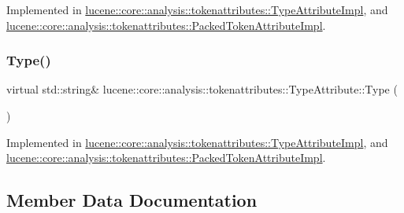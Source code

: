 Implemented in \mbox{\hyperlink{classlucene_1_1core_1_1analysis_1_1tokenattributes_1_1TypeAttributeImpl_a237875b669558ea7d58b6fa0b46a16a1}{lucene\+::core\+::analysis\+::tokenattributes\+::\+Type\+Attribute\+Impl}}, and \mbox{\hyperlink{classlucene_1_1core_1_1analysis_1_1tokenattributes_1_1PackedTokenAttributeImpl_ad5f1b7e5437154dada3da8cc4f89c642}{lucene\+::core\+::analysis\+::tokenattributes\+::\+Packed\+Token\+Attribute\+Impl}}.

\mbox{\label{classlucene_1_1core_1_1analysis_1_1tokenattributes_1_1TypeAttribute_a85bef723dc92f76228982ff3907c5d04}} 
\subsubsection{\texorpdfstring{Type()}{Type()}}
{\footnotesize\ttfamily virtual std\+::string\& lucene\+::core\+::analysis\+::tokenattributes\+::\+Type\+Attribute\+::\+Type (\begin{DoxyParamCaption}{ }\end{DoxyParamCaption})\hspace{0.3cm}{\ttfamily [pure virtual]}}



Implemented in \mbox{\hyperlink{classlucene_1_1core_1_1analysis_1_1tokenattributes_1_1TypeAttributeImpl_a612a5d915d4f189c5c4563f1a2358253}{lucene\+::core\+::analysis\+::tokenattributes\+::\+Type\+Attribute\+Impl}}, and \mbox{\hyperlink{classlucene_1_1core_1_1analysis_1_1tokenattributes_1_1PackedTokenAttributeImpl_ab9c0b48ded43a3c377136210dcbda215}{lucene\+::core\+::analysis\+::tokenattributes\+::\+Packed\+Token\+Attribute\+Impl}}.



\subsection{Member Data Documentation}
\mbox{\label{classlucene_1_1core_1_1analysis_1_1tokenattributes_1_1TypeAttribute_acb727b71590b34060e7d915afb885c27}} 
